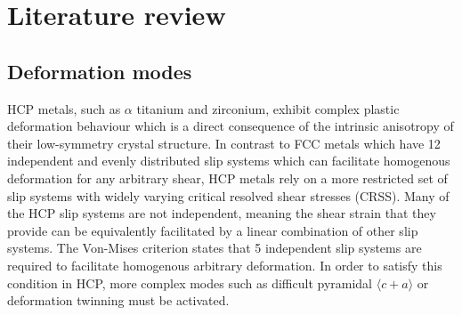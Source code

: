 \chapter{Literature review}

\section{Deformation modes}
HCP metals, such as $\alpha$ titanium and zirconium, exhibit complex plastic deformation behaviour which is a direct consequence of the intrinsic anisotropy of their low-symmetry crystal structure.
In contrast to FCC metals which have 12 independent and evenly distributed slip systems which can facilitate homogenous deformation for any arbitrary shear, HCP metals rely on a more restricted set of slip systems with widely varying critical resolved shear stresses (CRSS).
Many of the HCP slip systems are not independent, meaning the shear strain that they provide can be equivalently facilitated by a linear combination of other slip systems.
The Von-Mises criterion states that 5 independent slip systems are required to facilitate homogenous arbitrary deformation.
In order to satisfy this condition in HCP, more complex modes such as difficult pyramidal $\langle c + a \rangle$ or deformation twinning must be activated.

